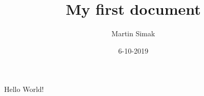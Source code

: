\documentclass{article}
\title{My first document}
\date{6-10-2019}
\author{Martin Simak}
\begin{document}
	\maketitle
	\newpage

	Hello World!
\end{document}
